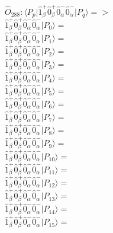\documentclass[14pt]{article}
\begin{document}
    $\hat{O}_{288}:  \langle{P_p}\vert \hat{1}_{\beta}^{+}\hat{0}_{\beta}^{+}\hat{0}_{\alpha}^{-}\hat{0}_{\alpha}^{-} \vert{P_q}\rangle => $ \\ 
    $ \hat{1}_{\beta}^{+}\hat{0}_{\beta}^{+}\hat{0}_{\alpha}^{-}\hat{0}_{\alpha}^{-} \vert{P_{0}}\rangle =  $ \\ 
    $ \hat{1}_{\beta}^{+}\hat{0}_{\beta}^{+}\hat{0}_{\alpha}^{-}\hat{0}_{\alpha}^{-} \vert{P_{1}}\rangle =  $ \\ 
    $ \hat{1}_{\beta}^{+}\hat{0}_{\beta}^{+}\hat{0}_{\alpha}^{-}\hat{0}_{\alpha}^{-} \vert{P_{2}}\rangle =  $ \\ 
    $ \hat{1}_{\beta}^{+}\hat{0}_{\beta}^{+}\hat{0}_{\alpha}^{-}\hat{0}_{\alpha}^{-} \vert{P_{3}}\rangle =  $ \\ 
    $ \hat{1}_{\beta}^{+}\hat{0}_{\beta}^{+}\hat{0}_{\alpha}^{-}\hat{0}_{\alpha}^{-} \vert{P_{4}}\rangle =  $ \\ 
    $ \hat{1}_{\beta}^{+}\hat{0}_{\beta}^{+}\hat{0}_{\alpha}^{-}\hat{0}_{\alpha}^{-} \vert{P_{5}}\rangle =  $ \\ 
    $ \hat{1}_{\beta}^{+}\hat{0}_{\beta}^{+}\hat{0}_{\alpha}^{-}\hat{0}_{\alpha}^{-} \vert{P_{6}}\rangle =  $ \\ 
    $ \hat{1}_{\beta}^{+}\hat{0}_{\beta}^{+}\hat{0}_{\alpha}^{-}\hat{0}_{\alpha}^{-} \vert{P_{7}}\rangle =  $ \\ 
    $ \hat{1}_{\beta}^{+}\hat{0}_{\beta}^{+}\hat{0}_{\alpha}^{-}\hat{0}_{\alpha}^{-} \vert{P_{8}}\rangle =  $ \\ 
    $ \hat{1}_{\beta}^{+}\hat{0}_{\beta}^{+}\hat{0}_{\alpha}^{-}\hat{0}_{\alpha}^{-} \vert{P_{9}}\rangle =  $ \\ 
    $ \hat{1}_{\beta}^{+}\hat{0}_{\beta}^{+}\hat{0}_{\alpha}^{-}\hat{0}_{\alpha}^{-} \vert{P_{10}}\rangle =  $ \\ 
    $ \hat{1}_{\beta}^{+}\hat{0}_{\beta}^{+}\hat{0}_{\alpha}^{-}\hat{0}_{\alpha}^{-} \vert{P_{11}}\rangle =  $ \\ 
    $ \hat{1}_{\beta}^{+}\hat{0}_{\beta}^{+}\hat{0}_{\alpha}^{-}\hat{0}_{\alpha}^{-} \vert{P_{12}}\rangle =  $ \\ 
    $ \hat{1}_{\beta}^{+}\hat{0}_{\beta}^{+}\hat{0}_{\alpha}^{-}\hat{0}_{\alpha}^{-} \vert{P_{13}}\rangle =  $ \\ 
    $ \hat{1}_{\beta}^{+}\hat{0}_{\beta}^{+}\hat{0}_{\alpha}^{-}\hat{0}_{\alpha}^{-} \vert{P_{14}}\rangle =  $ \\ 
    $ \hat{1}_{\beta}^{+}\hat{0}_{\beta}^{+}\hat{0}_{\alpha}^{-}\hat{0}_{\alpha}^{-} \vert{P_{15}}\rangle =  $ \\ 
    
\end{document}
